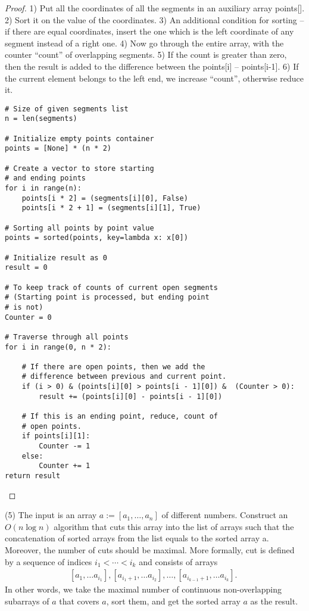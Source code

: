 \begin{proof}
1) Put all the coordinates of all the segments in an auxiliary array points[]. 
2) Sort it on the value of the coordinates. 
3) An additional condition for sorting – if there are equal coordinates, insert the one which is the left coordinate of any segment instead of a right one. 
4) Now go through the entire array, with the counter “count” of overlapping segments. 
5) If the count is greater than zero, then the result is added to the difference between the points[i] – points[i-1]. 
6) If the current element belongs to the left end, we increase “count”, otherwise reduce it.

\begin{verbatim}
# Size of given segments list
n = len(segments)
 
# Initialize empty points container
points = [None] * (n * 2)
 
# Create a vector to store starting
# and ending points
for i in range(n):
    points[i * 2] = (segments[i][0], False)
    points[i * 2 + 1] = (segments[i][1], True)
     
# Sorting all points by point value
points = sorted(points, key=lambda x: x[0])
 
# Initialize result as 0
result = 0
 
# To keep track of counts of current open segments
# (Starting point is processed, but ending point
# is not)
Counter = 0
 
# Traverse through all points
for i in range(0, n * 2):
   
    # If there are open points, then we add the
    # difference between previous and current point.
    if (i > 0) & (points[i][0] > points[i - 1][0]) &  (Counter > 0):
        result += (points[i][0] - points[i - 1][0])
         
    # If this is an ending point, reduce, count of
    # open points.
    if points[i][1]:
        Counter -= 1
    else:
        Counter += 1
return result
\end{verbatim}
\end{proof}
\vskip 0.4in




\begin{prob}
(5) The input is an array $a:=\left[a_1, \ldots, a_n\right]$ of different numbers. Construct an $O(n \log n)$ algorithm that cuts this array into the list of arrays such that the concatenation of sorted arrays from the list equals to the sorted array a. Moreover, the number of cuts should be maximal. More formally, cut is defined by a sequence of indices $i_1<\cdots<i_k$ and consists of arrays
\begin{gather*}
    \left[a_1, \ldots a_{i_1}\right],\left[a_{i_1+1}, \ldots a_{i_2}\right], \ldots,\left[a_{i_{k-1}+1}, \ldots a_{i_k}\right] \text {. }
\end{gather*}
In other words, we take the maximal number of continuous non-overlapping subarrays of $a$ that covers $a$, sort them, and get the sorted array $a$ as the result.
\end{prob}

